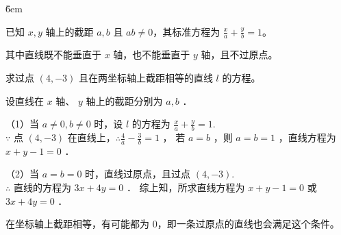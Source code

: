 \v{6em}

\begin{definition}[截距式]
    已知 $x, y$ 轴上的截距 $a, b$ 且 $ab \neq 0$，其标准方程为 $\frac{x}{a} + \frac{y}{b} = 1$。

    其中直线既不能垂直于 $x$ 轴，也不能垂直于 $y$ 轴，且不过原点。
\end{definition}

\begin{example}
    求过点 $(4,-3)$ 且在两坐标轴上截距相等的直线 $l$ 的方程。
\end{example}

\begin{solution}
    设直线在 $x$ 轴、 $y$ 轴上的截距分别为 $a, b$ ．

    （1）当 $a \neq 0, b \neq 0$ 时，设 $l$ 的方程为 $\frac{x}{a}+\frac{y}{b}=1$. \\
    $\because$ 点 $(4,-3)$ 在直线上，$\therefore \frac{4}{a}-\frac{3}{b}=1$ ，
    若 $a=b$ ，则 $a=b=1$ ，直线方程为 $x+y-1=0$ ．

    （2）当 $a=b=0$ 时，直线过原点，且过点 $(4,-3)$. \\
    $\therefore$ 直线的方程为 $3 x+4 y=0$ ．
    综上知，所求直线方程为 $x+y-1=0$ 或 $3 x+4 y=0$ ．
\end{solution}

\begin{warning}
    在坐标轴上截距相等，有可能都为 $0$，即一条过原点的直线也会满足这个条件。
\end{warning}


